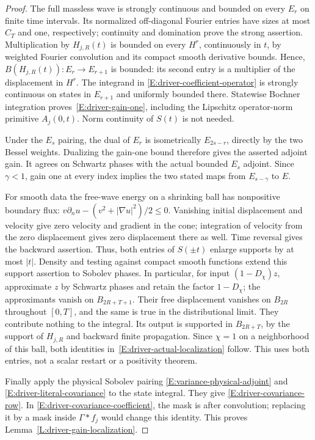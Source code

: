 \begin{proof}
  The full massless wave is strongly continuous and bounded on every
  $E_r$ on finite time intervals. Its normalized off-diagonal Fourier
  entries have sizes at most $C_T$ and one, respectively; continuity and
  domination prove the strong assertion. Multiplication by $H_{j,R}(t)$
  is bounded on every $H^r$, continuously in $t$, by weighted Fourier
  convolution and its compact smooth derivative bounds. Hence,
  $B(H_{j,R}(t)):E_r\to E_{r+1}$ is bounded: its second entry is a
  multiplier of the displacement in $H^r$. The integrand in
  \eqref{E:driver-coefficient-operator} is strongly continuous on states
  in $E_{r+1}$ and uniformly bounded there. Statewise Bochner integration
  proves~\eqref{E:driver-gain-one}, including the Lipschitz operator-norm
  primitive $A_j(0,t)$. Norm continuity of $S(t)$ is not needed.

  Under the $E_s$ pairing, the dual of $E_r$ is isometrically
  $E_{2s-r}$, directly by the two Bessel weights. Dualizing the gain-one
  bound therefore gives the asserted adjoint gain. It agrees on Schwartz
  phases with the actual bounded $E_s$ adjoint. Since $\gamma<1$, gain one
  at every index implies the two stated maps from $E_{s-\gamma}$ to $E$.

  For smooth data the free-wave energy on a shrinking ball has nonpositive
  boundary flux: $v\partial_nu-(v^2+|\nabla u|^2)/2\le0$. Vanishing
  initial displacement and velocity give zero velocity and gradient in
  the cone; integration of velocity from the zero displacement gives
  zero displacement there as well. Time reversal gives the backward
  assertion. Thus, both entries of $S(\pm t)$ enlarge supports by at most
  $|t|$. Density and testing against compact smooth functions extend this
  support assertion to Sobolev phases. In particular, for input
  $(1-D_\chi)z$, approximate $z$ by Schwartz phases and retain the factor
  $1-D_\chi$; the approximants vanish on $B_{2R+T+1}$. Their free
  displacement vanishes on $B_{2R}$ throughout $[0,T]$, and the same is
  true in the distributional limit. They contribute nothing to the integral.
  Its output is supported in $B_{2R+T}$, by the support of $H_{j,R}$ and
  backward finite propagation. Since $\chi=1$ on a neighborhood of this
  ball, both identities in~\eqref{E:driver-actual-localization} follow.
  This uses both entries, not a scalar restart or a positivity theorem.

  Finally apply the physical Sobolev pairing
  \eqref{E:variance-physical-adjoint} and
  \eqref{E:driver-literal-covariance} to the state integral. They give
  \eqref{E:driver-covariance-row}. In
  \eqref{E:driver-covariance-coefficient}, the mask is after convolution;
  replacing it by a mask inside $\Gamma*f_j$ would change this identity.
  This proves Lemma~\ref{L:driver-gain-localization}.
\end{proof}

